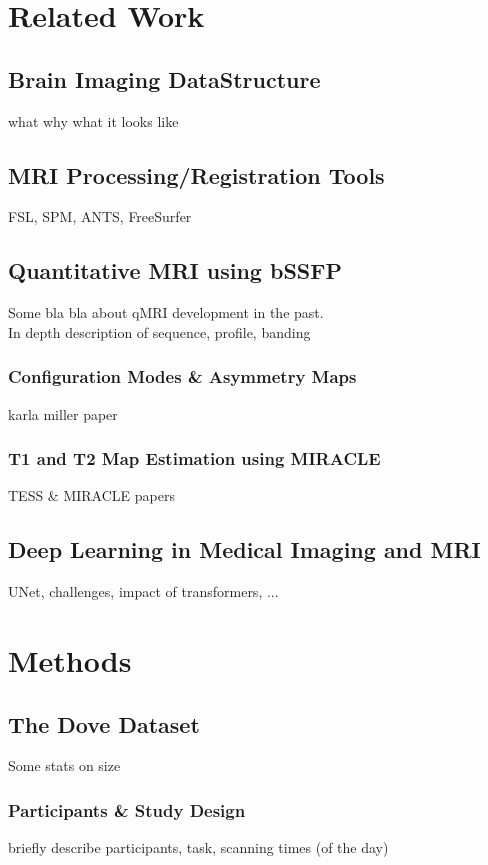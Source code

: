 \chapter{Related Work}
\section{Brain Imaging DataStructure}
what why what it looks like

\section{MRI Processing/Registration Tools}
FSL, SPM, ANTS, FreeSurfer

\section{Quantitative MRI using bSSFP}
Some bla bla about qMRI development in the past. \\
In depth description of sequence, profile, banding
\subsection{Configuration Modes \& Asymmetry Maps}
karla miller paper

\subsection{T1 and T2 Map Estimation using MIRACLE}
TESS \& MIRACLE papers

\section{Deep Learning in Medical Imaging and MRI}
UNet, challenges, impact of transformers, ...


\chapter{Methods}\label{\positionnumber} 
\section{The Dove Dataset}
Some stats on size 
\subsection{Participants \& Study Design}
briefly describe participants, task, scanning times (of the day)

